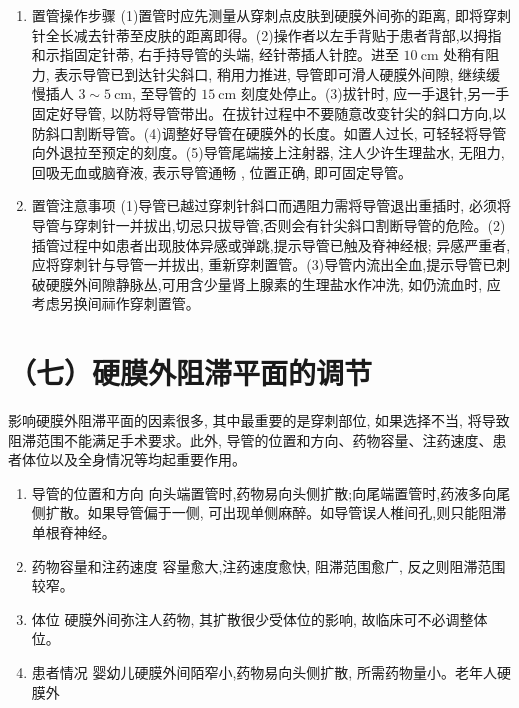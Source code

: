 \documentclass[10pt]{article}
\begin{document}
\begin{enumerate}
  \item 置管操作步骤 (1)置管时应先测量从穿刺点皮肤到硬膜外间弥的距离, 即将穿刺针全长减去针蒂至皮肤的距离即得。(2)操作者以左手背贴于患者背部,以拇指和示指固定针蒂, 右手持导管的头端, 经针蒂插人针腔。进至 $10 \mathrm{~cm}$ 处稍有阻力, 表示导管已到达针尖斜口, 稍用力推进, 导管即可滑人硬膜外间隙, 继续缓慢插人 $3 \sim 5 \mathrm{~cm}$, 至导管的 $15 \mathrm{~cm}$ 刻度处停止。(3)拔针时, 应一手退针,另一手固定好导管, 以防将导管带出。在拔针过程中不要随意改变针尖的斜口方向,以防斜口割断导管。(4)调整好导管在硬膜外的长度。如置人过长, 可轻轻将导管向外退拉至预定的刻度。(5)导管尾端接上注射器, 注人少许生理盐水, 无阻力, 回吸无血或脑脊液, 表示导管通畅 , 位置正确, 即可固定导管。

  \item 置管注意事项 (1)导管已越过穿刺针斜口而遇阻力需将导管退出重插时, 必须将导管与穿刺针一并拔出,切忌只拔导管,否则会有针尖斜口割断导管的危险。(2)插管过程中如患者出现肢体异感或弹跳,提示导管已触及脊神经根; 异感严重者, 应将穿刺针与导管一并拔出, 重新穿刺置管。(3)导管内流出全血,提示导管已刺破硬膜外间隙静脉丛,可用含少量肾上腺素的生理盐水作冲洗, 如仍流血时, 应考虑另换间祘作穿刺置管。

\end{enumerate}

\section*{（七）硬膜外阻滞平面的调节}
影响硬膜外阻滞平面的因素很多, 其中最重要的是穿刺部位, 如果选择不当, 将导致阻滞范围不能满足手术要求。此外, 导管的位置和方向、药物容量、注药速度、患者体位以及全身情况等均起重要作用。

\begin{enumerate}
  \item 导管的位置和方向 向头端置管时,药物易向头侧扩散;向尾端置管时,药液多向尾侧扩散。如果导管偏于一侧, 可出现单侧麻醉。如导管误人椎间孔,则只能阻滞单根脊神经。

  \item 药物容量和注药速度 容量愈大,注药速度愈快, 阻滞范围愈广, 反之则阻滞范围较窄。

  \item 体位 硬膜外间弥注人药物, 其扩散很少受体位的影响, 故临床可不必调整体位。

  \item 患者情况 婴幼儿硬膜外间陌窄小,药物易向头侧扩散, 所需药物量小。老年人硬膜外

\end{enumerate}
\end{document}
